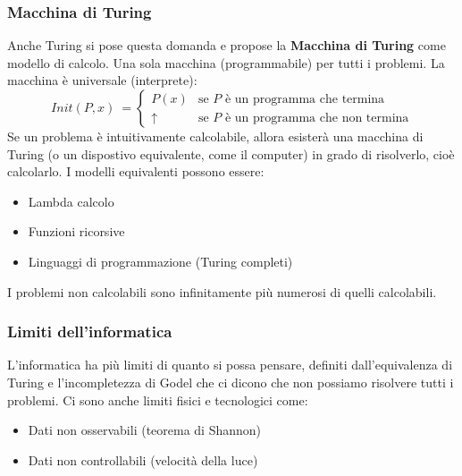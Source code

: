\documentclass[a4paper]{article}
\begin{document}
\subsubsection{Macchina di Turing} 

Anche Turing si pose questa domanda e propose la \textbf{Macchina di Turing} come modello di calcolo.
Una sola macchina (programmabile) per tutti i problemi.
La macchina è universale (interprete):
\[Init(P,x)\ = \begin{cases}
    P(x) & \text{se } P \text{ è un programma che termina}\\
    \uparrow & \text{se } P \text{ è un programma che non termina}
\end{cases}\]
Se un problema è intuitivamente calcolabile, allora esisterà una macchina di Turing (o un dispostivo
equivalente, come il computer) in grado di risolverlo, cioè calcolarlo.
I modelli equivalenti possono essere:
\begin{itemize}
    \item Lambda calcolo 
    \item Funzioni ricorsive
    \item Linguaggi di programmazione (Turing completi)
\end{itemize}
I problemi non calcolabili sono infinitamente più numerosi di quelli calcolabili.
\subsubsection{Limiti dell'informatica}

L'informatica ha più limiti di quanto si possa pensare, definiti dall'equivalenza di Turing
e l'incompletezza di Godel che ci dicono che non possiamo risolvere tutti i problemi.
Ci sono anche limiti fisici e tecnologici come:
\begin{itemize}
    \item Dati non osservabili (teorema di Shannon)
    \item Dati non controllabili (velocità della luce)
\end{itemize}
\end{document}
